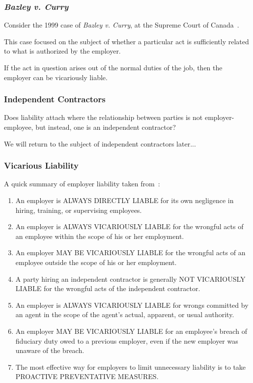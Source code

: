 \begin{frame}
\frametitle{\textit{Bazley v. Curry}}

Consider the 1999 case of \textit{Bazley v. Curry}, at the Supreme Court of Canada~\cite{vicarious}.

This case focused on the subject of whether a particular act is sufficiently related to what is authorized by the employer.

If the act in question arises out of the normal duties of the job, then the employer can be vicariously liable.


\end{frame}



\begin{frame}
\frametitle{Independent Contractors}

Does liability attach where the relationship between parties is not employer-employee, but instead, one is an independent contractor?

We will return to the subject of independent contractors later...

\end{frame}


\begin{frame}
\frametitle{Vicarious Liability}

A quick summary of employer liability taken from~\cite{vl2}:

\begin{enumerate}
	\item An employer is ALWAYS DIRECTLY LIABLE for its own negligence in hiring, training, or supervising employees. 
	\item An employer is ALWAYS VICARIOUSLY LIABLE for the wrongful acts of an employee within the scope of his or her employment. 
	\item An employer MAY BE VICARIOUSLY LIABLE for the wrongful acts of an employee outside the scope of his or her employment.
	\item A party hiring an independent contractor is generally NOT VICARIOUSLY LIABLE for the wrongful acts of the independent contractor. 
	\item An employer is ALWAYS VICARIOUSLY LIABLE for wrongs committed by an agent in the scope of the agent's actual, apparent, or usual authority. 
	\item An employer MAY BE VICARIOUSLY LIABLE for an employee's breach of fiduciary duty owed to a previous employer, even if the new employer was unaware of the breach.
	\item The most effective way for employers to limit unnecessary liability is to take PROACTIVE PREVENTATIVE MEASURES. 
\end{enumerate}


\end{frame}




